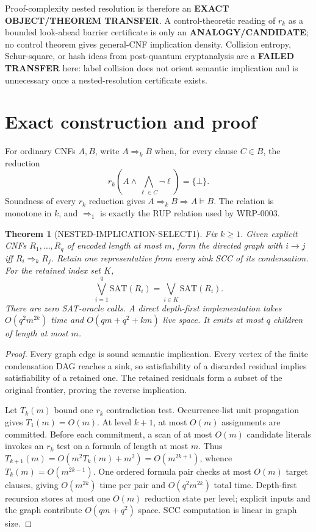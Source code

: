 \documentclass[11pt]{article}
\newtheorem{theorem}{Theorem}
\newcommand{\SAT}{\mathrm{SAT}}
\begin{document}
Proof-complexity nested resolution is therefore an \textbf{EXACT
OBJECT/THEOREM TRANSFER}.  A control-theoretic reading of $r_k$ as a bounded
look-ahead barrier certificate is only an \textbf{ANALOGY/CANDIDATE}; no
control theorem gives general-CNF implication density.  Collision entropy,
Schur-square, or hash ideas from post-quantum cryptanalysis are a
\textbf{FAILED TRANSFER} here: label collision does not orient semantic
implication and is unnecessary once a nested-resolution certificate exists.

\section*{Exact construction and proof}
For ordinary CNFs $A,B$, write $A\Rightarrow_kB$ when, for every clause
$C\in B$, the reduction
\[
 r_k\!\left(A\wedge\bigwedge_{\ell\in C}\neg\ell\right)=\{\bot\}.
\]
Soundness of every $r_k$ reduction gives $A\Rightarrow_kB\Longrightarrow
A\models B$.  The relation is monotone in $k$, and
$\Rightarrow_1$ is exactly the RUP relation used by WRP-0003.

\begin{theorem}[NESTED-IMPLICATION-SELECT1]
Fix $k\geq1$.  Given explicit CNFs $R_1,\ldots,R_q$ of encoded length at most
$m$, form the directed graph with $i\to j$ iff $R_i\Rightarrow_kR_j$.
Retain one representative from every sink SCC of its condensation.  For the
retained index set $K$,
\[
 \bigvee_{i=1}^{q}\SAT(R_i)=\bigvee_{i\in K}\SAT(R_i).
\]
There are zero SAT-oracle calls.  A direct depth-first implementation takes
$O(q^2m^{2k})$ time and $O(qm+q^2+km)$ live space.  It emits at most $q$
children of length at most $m$.
\end{theorem}
\begin{proof}
Every graph edge is sound semantic implication.  Every vertex of the finite
condensation DAG reaches a sink, so satisfiability of a discarded residual
implies satisfiability of a retained one.  The retained residuals form a
subset of the original frontier, proving the reverse implication.

Let $T_k(m)$ bound one $r_k$ contradiction test.  Occurrence-list unit
propagation gives $T_1(m)=O(m)$.  At level $k+1$, at most $O(m)$ assignments
are committed.  Before each commitment, a scan of at most $O(m)$ candidate
literals invokes an $r_k$ test on a formula of length at most $m$.  Thus
$T_{k+1}(m)=O(m^2T_k(m)+m^2)=O(m^{2k+1})$, whence
$T_k(m)=O(m^{2k-1})$.  One ordered formula pair checks at most $O(m)$ target
clauses, giving $O(m^{2k})$ time per pair and $O(q^2m^{2k})$ total time.
Depth-first recursion stores at most one $O(m)$ reduction state per level;
explicit inputs and the graph contribute $O(qm+q^2)$ space.  SCC computation
is linear in graph size.
\end{proof}
\end{document}
